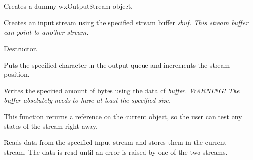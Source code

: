 \section{}\label{wxoutputstream}







Creates a dummy wxOutputStream object.


Creates an input stream using the specified stream buffer \it{sbuf}. This
stream buffer can point to another stream.



Destructor.



Puts the specified character in the output queue and increments the
stream position.



Writes the specified amount of bytes using the data of \it{buffer}. 
\it{WARNING!} The buffer absolutely needs to have at least the specified size.

This function returns a reference on the current object, so the user can test
any states of the stream right away.


Reads data from the specified input stream and stores them 
in the current stream. The data is read until an error is raised
by one of the two streams.

